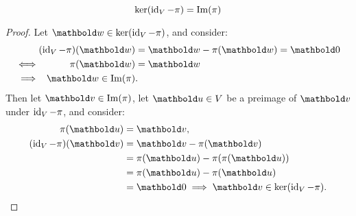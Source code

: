 \documentclass[11pt]{article}
\begin{document}
\begin{enumerate}
\begin{enumerate}
                    \[
                        \ker(\operatorname{id}_V - \pi) = \operatorname{Im}(\pi)
                    \]
                    \begin{proof}
                        Let $\vect{w} \in \ker(\id_V - \pi)$, and consider:
                        \[
                            \begin{alignedat}{2}
                                         &  & (\id_V - \pi)(\vect{w}) & = \vect{w} - \pi(\vect{w}) = \vect{0} \\
                                \iff     &  & \pi(\vect{w})           & = \vect{w}                            \\
                                \implies &  & \vect{w} \in \Img(\pi)  & .
                            \end{alignedat}
                        \]
                        Then let $\vect{v} \in \Img(\pi)$, let $\vect{u} \in V$ be a preimage of $\vect{v}$ under $\operatorname{id}_V - \pi$, and consider:
                        \[
                            \begin{aligned}
                                \pi(\vect{u})           & = \vect{v},                                         \\
                                (\id_V - \pi)(\vect{v}) & = \vect{v} - \pi(\vect{v})                          \\
                                                        & = \pi(\vect{u}) - \pi(\pi(\vect{u}))                \\
                                                        & = \pi(\vect{u}) - \pi(\vect{u})                     \\
                                                        & = \vect{0} \implies \vect{v} \in \ker(\id_V - \pi).
                            \end{aligned}
                        \]
                    \end{proof}
          \end{enumerate}


\end{enumerate}
\end{document}
